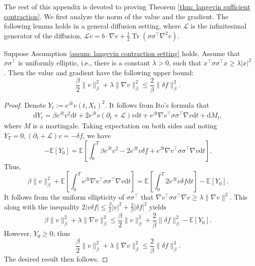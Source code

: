 \documentclass[twoside,11pt]{article}
\newcommand{\dd}{\mathrm{d}}
\newcommand{\E}{\mathbb{E}}
\newcommand{\1}{\mathbf{1}}
\numberwithin{equation}{section}
\begin{document}
The rest of this appendix is devoted to proving Theorem \ref{thm: langevin sufficient contraction}. We first analyze the norm of the value and the gradient. The following lemma holds in a general diffusion setting, where $\mathcal L$ is the infinitesimal generator of the diffusion, $ \mathcal L v=b\cdot\nabla v+\frac{1}{2}\operatorname{Tr}\left(\sigma\sigma^{\top}\nabla^2 v\right)$.



\begin{lemma}
    Suppose Assumption \ref{assum: langevin contraction setting} holds. Assume that $\sigma\sigma^{\top}$ is uniformly elliptic, i.e., there is a constant $\lambda >0 $, such that $x^{\top} \sigma\sigma^{\top} x \ge \lambda |x|^2$. Then the value and gradient have the following upper bound:
    \begin{equation}\label{eq: value gradient bound}
    \frac{\beta}{2}\|v\|_{\beta}^2 + \lambda\|\nabla v\|_{\beta}^2 \le \frac{2}{\beta}\|\delta f\|_{\beta}^2.
\end{equation}
\end{lemma}
\begin{proof}
Denote $ Y_t:= e^{\beta t}v(t,X_t)^2$. It follows from Ito's formula that
\begin{equation}
    \begin{aligned}
        \dd Y_t = \beta e^{\beta t}v^2 \dd t + 2e^{\beta t}v(\partial_t + \mathcal{L})v \dd t + e^{\beta t}\nabla v^{\top}\sigma\sigma^{\top}\nabla v\dd t + \dd M_t,
    \end{aligned}
\end{equation}
where $ M$ is a martingale. Taking expectation on both sides and noting $ Y_T = 0, (\partial_t + \mathcal{L})v = -\delta f$, we have
\begin{equation}
    -\E[Y_0] = \E\left[\int_0^T \beta e^{\beta t}v^2 - 2e^{\beta t}v\delta f  + e^{\beta t}\nabla v^{\top} \sigma\sigma^{\top}\nabla v \dd t\right].
\end{equation}
Thus,
\begin{equation}
    \beta \|v\|_{\beta}^2 + \E\left[\int_0^Te^{\beta t}\nabla v^{\top} \sigma\sigma^{\top}\nabla v \dd t\right] = \E\left[\int_0^T2e^{\beta t}v\delta f\dd t\right] - \E[Y_0].
\end{equation}
It follows from the uniform ellipticity of $ \sigma\sigma^{\top}$ that $ \nabla v^{\top} \sigma\sigma^{\top}\nabla v \ge \lambda \|\nabla v\|^2$. This along with the inequality $ 2|v\delta f|\le \frac{\beta}{2}|v|^2 + \frac{2}{\beta}|\delta f|^2$ yields
\begin{equation}
    \beta\|v\|_{\beta}^2 + \lambda\|\nabla v\|_{\beta}^2 \le \frac{\beta}{2}\|v\|_{\beta}^2 + \frac{2}{\beta}\|\delta f\|_{\beta}^2-\E[Y_0].
\end{equation}
However,  $ Y_0\ge 0$; thus
\begin{equation}
    \frac{\beta}{2}\|v\|_{\beta}^2 + \lambda\|\nabla v\|_{\beta}^2 \le \frac{2}{\beta}\|\delta f\|_{\beta}^2.
\end{equation}
The desired result then follows.
\end{proof}
\end{document}
